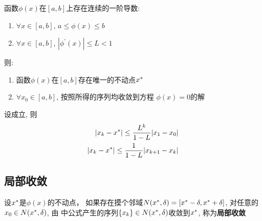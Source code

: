 \begin{convergence_of_iterative_formula}
    \label{theorem:convergence_of_iterative_formula}
    函数$\phi(x)$在$[a,b]$上存在连续的一阶导数:
    \begin{enumerate}
        \item $\forall x\in[a,b]$, $a\le\phi(x)\le b$
        \item $\forall x\in[a,b]$, $|\phi^\prime(x)|\le L < 1$
    \end{enumerate}
    则:
    \begin{enumerate}
        \item 函数$\phi(x)$在$[a,b]$存在唯一的不动点$x^\ast$
        \item $\forall x_0\in[a,b]$, 按照所得的序列均收敛到方程%
            $\phi(x)=0$的解
    \end{enumerate}
\end{convergence_of_iterative_formula}


\medskip

\begin{deviation_of_iterative_formula}
    \label{theorem:deviation_of_iterative_formula}
    设成立, 则
    \begin{subequations}
        \begin{align}
            |x_k - x^\ast|\le{L^k\over{1-L}}|x_1 - x_0|\\
            |x_k - x^\ast|\le{1\over{1-L}}|x_{k+1}-x_k|
        \end{align}
    \end{subequations}
\end{deviation_of_iterative_formula}

\subsection{局部收敛}

\begin{local_convergence}
    \label{definition:local_convergence}
    设$x^\ast$是$\phi(x)$的不动点， 如果存在摸个邻域$N(x^\ast, \delta)=[x^\ast-\delta,x^\ast+\delta]$,%
    对任意的$x_0\in N(x^\ast, \delta)$, 由%
    中公式产生的序列$\{x_k\}\in N(x^\ast, \delta)$收敛到$x^\ast$, 称为{\bf 局部收敛}
\end{local_convergence}

